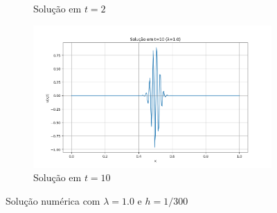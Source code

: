 \documentclass[column,amsmath,amssymb,floatfix]{revtex4}
\begin{document}
\begin{figure}[H]
\begin{subfigure}{0.35\textwidth}
     \caption{Solução em $t=2$}
     \label{fig:ex3_3}
 \end{subfigure}
 \begin{subfigure}{0.35\textwidth}
     \includegraphics[width=\textwidth]{img/ex0304.png}
     \caption{Solução em $t=10$}
     \label{fig:ex3_4}
 \end{subfigure}
 \caption{Solução numérica com $\lambda=1.0$ e $h=1/300$}
 \label{fig:ex3_lambda1}
\end{figure}
\end{document}
